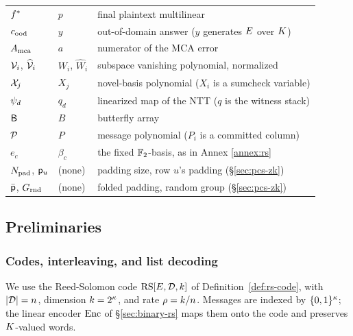 \begin{center}
\begin{tabular}{@{}lll@{}}
$f^{\ast}$      & $p$          & final plaintext multilinear\\
$c_{\mathrm{ood}}$        & $y$          & out-of-domain answer ($y$ generates $E$ over $K$)\\
$A_{\mathrm{mca}}$      & $a$          & numerator of the MCA error\\
$\mathcal{V}_i$, $\widehat{\mathcal{V}}_{i}$ & $W_i$, $\widehat W_i$ & subspace vanishing polynomial, normalized\\
$\mathcal{X}_j$     & $X_j$        & novel-basis polynomial ($X_i$ is a sumcheck variable)\\
$\psi_d$     & $q_d$        & linearized map of the NTT ($q$ is the witness stack)\\
$\mathsf{B}$       & $B$          & butterfly array\\
$\mathcal{P}$       & $P$          & message polynomial ($P_i$ is a committed column)\\
$e_c$          & $\beta_c$    & the fixed $\mathbb{F}_2$-basis, as in Annex \ref{annex:rs}\\
$N_{\mathrm{pad}}$, $\mathsf{p}_u$ & (none)   & padding size, row $u$'s padding (\S\ref{sec:pcs-zk})\\
$\bar{\mathsf{p}}$, $G_{\mathrm{rnd}}$ & (none) & folded padding, random group (\S\ref{sec:pcs-zk})\\
\hline
\end{tabular}
\end{center}

\subsection{Preliminaries}\label{sec:prelims}

\subsubsection{Codes, interleaving, and list decoding}\label{sec:codes}

We use the Reed-Solomon code $\mathrm{RS}[E,\mathcal{D},k]$ of Definition~\ref{def:rs-code}, with $|\mathcal{D}|=n$, dimension $k=2^\kappa$, and rate $\rho=k/n$. Messages are indexed by $\{0,1\}^{\kappa}$; the linear encoder $\mathrm{Enc}$ of \S\ref{sec:binary-rs} maps them onto the code and preserves $K$-valued words.

